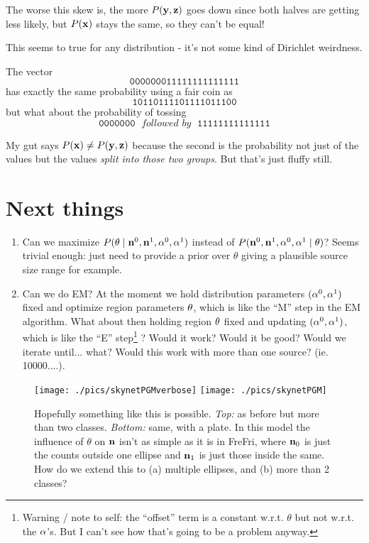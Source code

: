 \documentclass[12pt]{article}
\begin{document}
The worse this skew is, the more $P(\mathbf{y}, \mathbf{z})$ goes down since both
halves are getting less likely, but $P(\mathbf{x})$ stays the same, so they
can't be equal!

This seems to true for any distribution - it's not some kind of
Dirichlet weirdness.

{}

The vector \[\mathtt{000000011111111111111}\] has exactly the same
probability using a fair coin as \[\mathtt{10110111101111011100}\]
but what about the probability of 
tossing \[\mathtt{0000000} \;\textit{ followed by  } \;\mathtt{11111111111111}\]

My gut says $P(\mathbf{x}) \neq P(\mathbf{y} , \mathbf{z})$ because the second is the
probability not just of the values but the values {\it split into those two
groups}. But that's just fluffy still.





\section{Next things}

\begin{enumerate}
\item Can we maximize $P(\mathbf{\theta} \mid \mathbf{n}^0,  \mathbf{n}^1, \mathbf{\alpha}^0, \mathbf{\alpha}^1)$ instead of $P(\mathbf{n}^0,  \mathbf{n}^1, \mathbf{\alpha}^0, \mathbf{\alpha}^1 \mid \mathbf{\theta})$? Seems trivial enough: just need to provide a prior over $\theta$ giving a plausible source size range for example.
\item Can we do EM? At the moment we hold distribution parameters
  $(\mathbf{\alpha}^0,\mathbf{\alpha}^1)$ fixed and optimize region parameters
  $\mathbf{\theta}$, which is like the ``M'' step in the EM algorithm. What
  about then holding region $\mathbf{\theta}$ fixed and updating
  $(\mathbf{\alpha}^0,\mathbf{\alpha}^1)$, which is like the ``E''
  step\footnote{Warning / note to self: the ``offset'' term is a
    constant w.r.t. $\theta$ but not w.r.t. the $\mathbf{\alpha}$'s. But I
    can't see how that's going to be a problem anyway.}  ? Would it
  work? Would it be good? Would we iterate until... what? Would this
  work with more than one source? (ie. 10000....).
\end{enumerate}

\begin{figure}
\texttt{[image: ./pics/skynetPGMverbose]}
\texttt{[image: ./pics/skynetPGM]}
\caption{Hopefully something like this is possible. {\it Top:} as
  before but more than two classes.  {\it Bottom:} same, with a plate.
  In this model the influence of $\theta$ on $\mathbf{n}$ isn't as simple as
  it is in {\sc FreFri}, where $\mathbf{n}_0$ is just the counts outside one
  ellipse and $\mathbf{n}_1$ is just those inside the same. How do we extend
  this to (a) multiple ellipses, and (b) more than 2 classes?  }
\end{figure}
\end{document}

